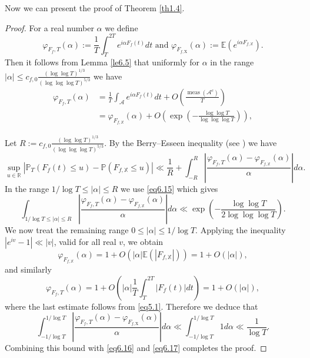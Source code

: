 \documentclass[10pt,leqno]{amsart}
\numberwithin{equation}{section}
\begin{document}
Now we can present the proof of Theorem \ref{th1.4}. 
\begin{proof}
For a real number $\alpha$ we define
\[
\varphi_{F_f, T}(\alpha):=\frac{1}{T} \int_T^{2 T} e^{i \alpha F_f(t)} d t \text { and } \varphi_{F_{f,\mathrm{X}}}(\alpha):=\mathbb{E}\left(e^{i \alpha F_{f,\mathbb{X}}}\right).
\]
 Then it follows from Lemma \ref{le6.5} that uniformly for $\alpha$ in the range $|\alpha| \leqslant c_{f,0}\frac{\left(\log\log T\right)^{1/3}}{\left(\log\log\log T\right)^{5/3}}$ we have
\begin{equation}\label{eq6.15}
\begin{aligned}
    \varphi_{F_f, T}(\alpha)&=\frac{1}{T} \int_{\mathcal{A}} e^{i \alpha F_f(t)} d t+O\left(\frac{\operatorname{meas}\left(\mathcal{A}^c\right)}{T}\right)\\
    &=\varphi_{F_{f,\mathbb{X}}}(\alpha)+O\left(\exp \left(-\frac{\log \log  T}{\log \log \log T}\right)\right),
\end{aligned}
\end{equation}

Let $R:=c_{f,0}\frac{\left(\log\log T\right)^{1/3}}{\left(\log\log\log T\right)^{5/3}}$. By the Berry--Esseen inequality (see \cite[Lemma 1.47]{MR551361}) we have
\begin{equation}\label{eq6.16}
    \sup _{u \in \mathbb{R}}\left|\mathbb{P}_T(F_f(t) \leqslant u)-\mathbb{P}\left(F_{f,\mathbb{X}} \leqslant u\right)\right| \ll \frac{1}{R}+\int_{-R}^R\left|\frac{\varphi_{F_f, T}(\alpha)-\varphi_{F_{f,\mathbb{X}}}(\alpha)}{\alpha}\right| d \alpha.
\end{equation}
In the range $1 / \log T \leqslant|\alpha| \leqslant R$ we use \eqref{eq6.15} which gives
\begin{equation}\label{eq6.17}
    \int_{1 / \log T \leqslant|\alpha| \leqslant R}\left|\frac{\varphi_{F_f, T}(\alpha)-\varphi_{F_{f,\mathbb{X}}}(\alpha)}{\alpha}\right| d \alpha \ll \exp \left(-\frac{\log \log T}{2 \log \log\log T}\right).
\end{equation}
We now treat the remaining range $0 \le |\alpha| \le 1/\log T$. Applying the inequality $|e^{iv}-1| \ll |v|$, valid for all real $v$, we obtain
\[
\varphi_{F_{f,\mathbb{X}}}(\alpha)=1+O\left(|\alpha| \mathbb{E}\left(\left|F_{f,\mathbb{X}}\right|\right)\right)=1+O(|\alpha|),
\]
and similarly
\[
\varphi_{F_f, T}(\alpha)=1+O\left(|\alpha| \frac{1}{T} \int_T^{2 T}|F_f(t)| d t\right)=1+O(|\alpha|),
\]
where the last estimate follows from \eqref{eq5.1}. Therefore we deduce that
\[
\int_{-1 / \log T}^{1 / \log T}\left|\frac{\varphi_{F_f, T}(\alpha)-\varphi_{F_{f,\mathrm{X}}}(\alpha)}{\alpha}\right| d \alpha \ll \int_{-1 / \log T}^{1 / \log T} 1 d \alpha \ll \frac{1}{\log T} .
\]
Combining this bound with \eqref{eq6.16} and \eqref{eq6.17} completes the proof.
\end{proof}
\end{document}

